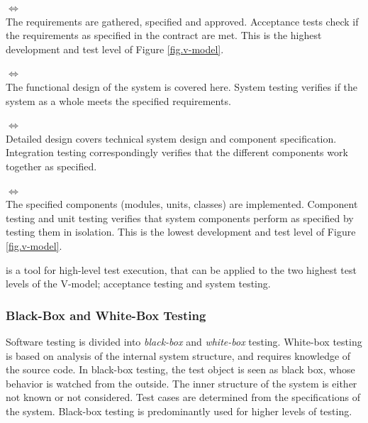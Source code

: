 \begin{Description}
    \setlength{\itemsep}{1pt}
    \setlength{\parskip}{4pt}
    \setlength{\parsep}{0pt}
    \item[\betterfakesc{Requirements} $\Leftrightarrow$ \betterfakesc{Acceptance Test}]\hfill\\
    The requirements are gathered, specified and approved. Acceptance tests check if the requirements as specified in the contract are met. This is the highest development and test level of Figure \ref{fig.v-model}.
    \item[\betterfakesc{High-Level Design} $\Leftrightarrow$ \betterfakesc{System Test}]\hfill\\
    The functional design of the system is covered here. System testing verifies if the system as a whole meets the specified requirements.
    \item[\betterfakesc{Detailed Design} $\Leftrightarrow$ \betterfakesc{Integration Test}]\hfill\\
    Detailed design covers technical system design and component specification. Integration testing correspondingly verifies that the different components work together as specified.
    \item[\betterfakesc{Coding} $\Leftrightarrow$ \betterfakesc{Unit Test}]\hfill\\
    The specified components (modules, units, classes) are implemented. Component testing and unit testing verifies that system components perform as specified by testing them in isolation. This is the lowest development and test level of Figure \ref{fig.v-model}.
\end{Description}

\noindent \toolname \space is a tool for high-level test execution, that can be applied to the two highest test levels of the V-model; acceptance testing and system testing.


\subsubsection{Black-Box and White-Box Testing}
\noindent Software testing is divided into \emph{black-box} and \emph{white-box} testing. White-box testing is based on analysis of the internal system structure, and requires knowledge of the source code. In black-box testing, the test object is seen as black box, whose behavior is watched from the outside. The inner structure of the system is either not known or not considered. Test cases are determined from the specifications of the system. Black-box testing is predominantly used for higher levels of testing.

